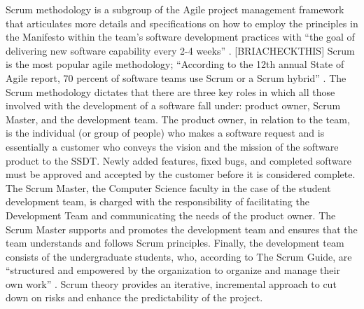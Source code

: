 Scrum methodology is a subgroup of the Agile project management framework that articulates more details and specifications on how to employ the principles in the Manifesto within the team's software development practices with ``the goal of delivering new software capability every 2-4 weeks'' \cite{thescrumguide}. [BRIACHECKTHIS] Scrum is the most popular agile methodology; ``According to the 12th annual State of Agile report, 70 percent of software teams use Scrum or a Scrum hybrid'' \cite{}. The Scrum methodology dictates that there are three key roles in which all those involved with the development of a software fall under: product owner, Scrum Master, and the development team. The product owner, in relation to the team, is the individual (or group of people) who makes a software request and is essentially a customer who conveys the vision and the mission of the software product to the SSDT. Newly added features, fixed bugs, and completed software must be approved and accepted by the customer before it is considered complete. The Scrum Master, the Computer Science faculty in the case of the student development team, is charged with the responsibility of facilitating the Development Team and communicating the needs of the product owner. The Scrum Master supports and promotes the development team and ensures that the team understands and follows Scrum principles. Finally, the development team consists of the undergraduate students, who, according to The Scrum Guide, are ``structured and empowered by the organization to organize and manage their own work'' \cite{}. Scrum theory provides an iterative, incremental approach to cut down on risks and enhance the predictability of the project. 



